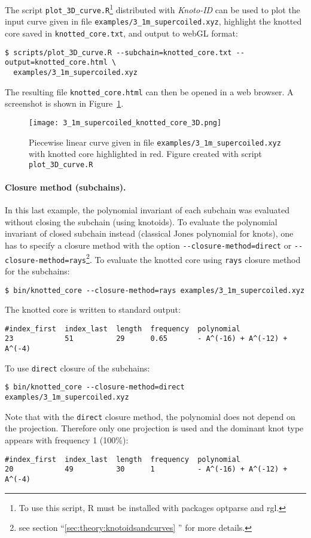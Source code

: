 The script \lstinline{plot_3D_curve.R}\footnote{To use this script, {\ttfamily R}\cite{r2017} must be installed with packages {\ttfamily optparse}\cite{optparse} and {\ttfamily rgl}\cite{rgl}.} distributed with {\it Knoto-ID} can be used to plot the input curve given in file \lstinline{examples/3_1m_supercoiled.xyz}, highlight the knotted core saved in \lstinline{knotted_core.txt}, and output to webGL format\cite{webgl}:
\begin{lstlisting}
$ scripts/plot_3D_curve.R --subchain=knotted_core.txt --output=knotted_core.html \
  examples/3_1m_supercoiled.xyz
\end{lstlisting}
The resulting file \lstinline{knotted_core.html} can then be opened in a web browser. A screenshot is shown in Figure~\ref{fig:3_1m_supercoiled:knottedcore:3D}.
\begin{figure}[t]
\centering
\texttt{[image: 3\_1m\_supercoiled\_knotted\_core\_3D.png]}
\caption{Piecewise linear curve given in file \lstinline{examples/3_1m_supercoiled.xyz} with knotted core highlighted in red. Figure created with script \lstinline{plot_3D_curve.R}}\label{fig:3_1m_supercoiled:knottedcore:3D}
\end{figure}



\paragraph{Closure method (subchains).}
In this last example, the polynomial invariant of each subchain was evaluated without closing the subchain (using knotoids). To evaluate the polynomial invariant of closed subchain instead (classical Jones polynomial for knots), one has to specify a closure method with the option \lstinline{--closure-method=direct} or \lstinline{--closure-method=rays}\footnote{see section ``\ref{sec:theory:knotoidsandcurves} '' for more details.}. To evaluate the knotted core using \lstinline{rays} closure method for the subchains:
\begin{lstlisting}
$ bin/knotted_core --closure-method=rays examples/3_1m_supercoiled.xyz
\end{lstlisting}
The knotted core is written to standard output:
\begin{lstlisting}
#index_first  index_last  length  frequency  polynomial
23            51          29      0.65       - A^(-16) + A^(-12) + A^(-4)
\end{lstlisting}
To use \lstinline{direct} closure of the subchains:
\begin{lstlisting}
$ bin/knotted_core --closure-method=direct examples/3_1m_supercoiled.xyz
\end{lstlisting}
Note that with the \lstinline{direct} closure method, the polynomial does not depend on the projection. Therefore only one projection is used and the dominant knot type appears with frequency 1 (100\%):
\begin{lstlisting}
#index_first  index_last  length  frequency  polynomial
20            49          30      1          - A^(-16) + A^(-12) + A^(-4)
\end{lstlisting}

